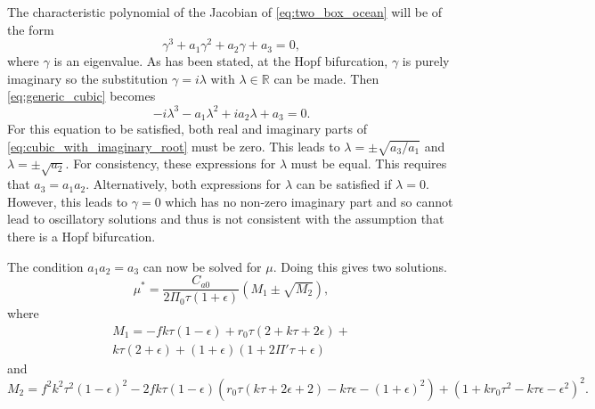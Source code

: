 The characteristic polynomial of the Jacobian of \cref{eq:two_box_ocean} will be of the form
\begin{equation}
  \label{eq:generic_cubic}
  \gamma^3 + a_1 \gamma^2 + a_2 \gamma + a_3 = 0,
\end{equation}
where $\gamma$ is an eigenvalue. As has been stated, at the Hopf bifurcation, $\gamma$ is purely imaginary so the substitution $\gamma = i\lambda$ with $\lambda \in \mathbb{R}$
can be made. Then \cref{eq:generic_cubic} becomes
\begin{equation}
  \label{eq:cubic_with_imaginary_root}
  -i\lambda^3 - a_1 \lambda^2 + i a_2 \lambda + a_3 = 0. 
\end{equation}
For this equation to be satisfied, both real and imaginary parts of \cref{eq:cubic_with_imaginary_root} must be zero. This leads to
$\lambda = \pm \sqrt{a_3/a_1}$ and $\lambda = \pm \sqrt{a_2}$. For consistency, these expressions for $\lambda$ must be equal. This requires that $a_3 = a_1a_2$.
Alternatively, both expressions for $\lambda$ can be satisfied if $\lambda = 0$. However, this leads to $\gamma = 0$ which has no non-zero imaginary part and so cannot lead to
oscillatory solutions and thus is not consistent with the assumption that there is a Hopf bifurcation.

The condition $a_1a_2=a_3$  can now be solved for $\mu$. Doing this gives two solutions.
\begin{equation}
  \label{eq:mu_two_box}
  \mu^* = \frac{C_{a0}}{2 \Pi_0 \tau  (1+\epsilon)} \left(M_1\pm\sqrt{M_2}\right),
\end{equation}
where
\begin{equation}
  \begin{split}
    M_1 = -f k \tau  (1-\epsilon)+r_0 \tau  (2 + k \tau +2 \epsilon) + \\ k \tau  (2+\epsilon)+(1+\epsilon) (1+2 \Pi' \tau +\epsilon)
\end{split}
\end{equation}
and
\begin{dmath}
  M_2 = f^2 k^2 \tau ^2 (1-\epsilon)^2-2 f k \tau  (1-\epsilon) \left(r_0 \tau  (k \tau +2 \epsilon +2)-k \tau  \epsilon -(1+\epsilon)^2\right) 
  +\left(1+k r_0 \tau ^2-k \tau  \epsilon -\epsilon ^2\right)^2.
\end{dmath}

